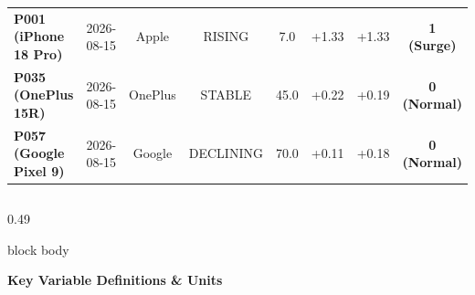 \documentclass[aspectratio=169, 10pt]{beamer}
\newenvironment{card}[1][]{%
        \begin{beamercolorbox}[rounded=true,shadow=false,wd=\linewidth,sep=3.5pt,#1]{block body}%
        \fontsize{7.8pt}{9.8pt}\selectfont%
    }{%
        \end{beamercolorbox}%
    }
\begin{document}
\begin{frame}[t]
\begin{table}[h]
\begin{tabular}{llcccccc}
                \textbf{P001 (iPhone 18 Pro)} & 2026-08-15 & Apple & RISING & 7.0 & +1.33 & +1.33 & \textbf{1 (Surge)} \\                                                         
                \textbf{P035 (OnePlus 15R)} & 2026-08-15 & OnePlus & STABLE & 45.0 & +0.22 & +0.19 & \textbf{0 (Normal)} \\                                                           
                \textbf{P057 (Google Pixel 9)} & 2026-08-15 & Google & DECLINING & 70.0 & +0.11 & +0.18 & \textbf{0 (Normal)} \\                                                    
                \bottomrule                                                                                                                                                                            
            \end{tabular}                                                                                                                                                                              
        \end{table}                                                                                                                                                                                    
        \vspace{-0.15cm}                                                                                                                                                                               
        \begin{columns}[T]                                                                                                                                                                             
            \begin{column}{0.49\textwidth}                                                                                                                                                             
                \begin{card}                                                                                                                                                                           
                    {\fontsize{7.5pt}{9pt}\selectfont \textbf{\color{NavyPrimary}Key Variable Definitions \& Units}}\\[0.04cm]                                                                         
                    \begin{itemize}\setlength{\itemsep}{1.5pt}                                                                                                                                         

\end{itemize}
\end{card}
\end{column}
\end{columns}
\end{frame}
\end{document}
